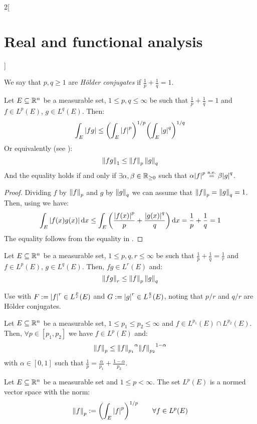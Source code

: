 \documentclass[../../../main_math.tex]{subfiles}
\begin{document}
\begin{multicols}{2}[\section{Real and functional analysis}]
  \begin{definition}
    We say that $p,q\geq 1$ are \emph{Hölder conjugates} if $\frac{1}{p}+\frac{1}{q}=1$.
  \end{definition}
  \begin{proposition}\label{RFA:holder}
    Let $E\subseteq\mathbb{R}^n$ be a measurable set, $1\leq p,q\leq \infty$ be such that $\frac{1}{p}+\frac{1}{q}=1$ and ${f}\in L^p(E)$, ${g}\in L^q(E)$. Then:
    $$\int_E\abs{fg}\leq {\left(\int_E\abs{f}^p\right)}^{1/p}{\left(\int_E\abs{g}^q\right)}^{1/q}$$
    Or equivalently (see ):
    $$\left\|{fg}\right\|_1\leq\left\|{f}\right\|_p\left\|{g}\right\|_q$$
    And the equality holds if and only if $\exists \alpha,\beta\in\mathbb{R}_{\geq 0}$ such that $\alpha{\abs{{f}}}^p\overset{\text{a.e.}}{=}\beta{\abs{{g}}}^q$.
  \end{proposition}
  \begin{proof}
    Dividing $f$ by $\left\|f\right\|_p$ and $g$ by $\left\|g\right\|_q$ we can assume that $\left\|f\right\|_p=\left\|g\right\|_q=1$. Then, using  we have:
    $$\int_E\abs{f(x)g(x)}\dd{x}\leq\int_E\left(\frac{\abs{f(x)}^p}{p}+\frac{\abs{g(x)}^q}{q}\right)\dd{x}=\frac{1}{p}+\frac{1}{q}=1$$
    The equality follows from the equality in .
  \end{proof}
  \begin{corollary}
    Let $E\subseteq\mathbb{R}^n$ be a measurable set, $1\leq p,q, r\leq \infty$ be such that $\frac{1}{p}+\frac{1}{q}=\frac{1}{r}$ and ${f}\in L^p(E)$, ${g}\in L^q(E)$. Then, $fg\in L^r(E)$ and:
    $$\left\|{fg}\right\|_r\leq\left\|{f}\right\|_p\left\|{g}\right\|_q$$
  \end{corollary}
  \begin{sproof}
    Use  with $F:=\abs{f}^r\in L^{\frac{p}{r}}(E)$ and $G:=\abs{g}^r\in L^{\frac{q}{r}}(E)$, noting that $p/r$ and $q/r$ are Hölder conjugates.
  \end{sproof}
  \begin{corollary}
    Let $E\subseteq\mathbb{R}^n$ be a measurable set, $1\leq p_1\leq p_2\leq \infty$ and $f\in L^{p_1}(E)\cap L^{p_2}(E)$. Then, $\forall p\in[p_1,p_2]$ we have $f\in L^p(E)$ and:
    $$
      \left\|f\right\|_p\leq {\left\|f\right\|_{p_1}}^\alpha{\left\|f\right\|_{p_2}}^{1-\alpha}
    $$
    with $\alpha\in[0,1]$ such that $\frac{1}{p}=\frac{\alpha}{p_1}+\frac{1-\alpha}{p_2}$.
  \end{corollary}
  \begin{proposition}\label{RFA:lpnorm}
    Let $E\subseteq\mathbb{R}^n$ be a measurable set and $1\leq p<\infty$. The set $L^p(E)$ is a normed vector space with the norm: $$\left\|{f}\right\|_p:={\left(\int_E\abs{{f}}^p\right)}^{1/p}\qquad\forall{f}\in L^p(E)$$

\end{proposition}
\end{multicols}
\end{document}
